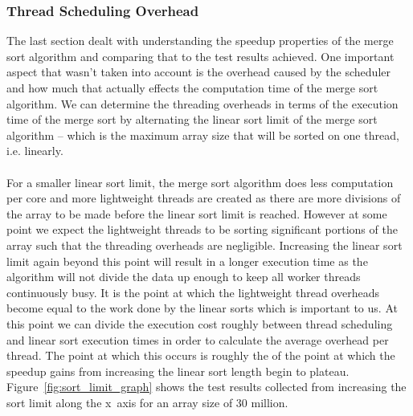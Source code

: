 \documentclass[12pt,twoside,notitlepage]{report}
\begin{document}
\subsubsection{Thread Scheduling Overhead}
The last section dealt with understanding the speedup properties of the merge sort algorithm and comparing that to the test results achieved. One important aspect that wasn't taken into account is the overhead caused by the scheduler
and how much that actually effects the computation time of the merge sort algorithm. We can determine the threading overheads in terms of the execution time of the merge sort by alternating the linear sort limit of the merge sort
algorithm -- which is the maximum array size that will be sorted on one thread, i.e. linearly. 
\hfill\\
\hfill\\
For a smaller linear sort limit, the merge sort algorithm does less computation per core and more lightweight threads are created as there
are more divisions of the array to be made before the linear sort limit is reached. However at some point we expect the lightweight threads to be sorting significant portions of the array such that the threading overheads are
negligible. Increasing the linear sort limit again beyond this point will result in a longer execution time as the algorithm will not divide the data up enough to keep all worker threads continuously busy. It is the point at which the
lightweight thread overheads become equal to the work done by the linear sorts which is important to us. At this point we can divide the execution cost roughly between thread scheduling and linear sort execution times in order to
calculate the average overhead per thread. The point at which this occurs is roughly the of the point at which the speedup gains from increasing the linear sort length begin to plateau. Figure~\ref{fig:sort_limit_graph} shows the test
results collected from increasing the sort limit along the x~axis for an array size of 30 million.
\end{document}
